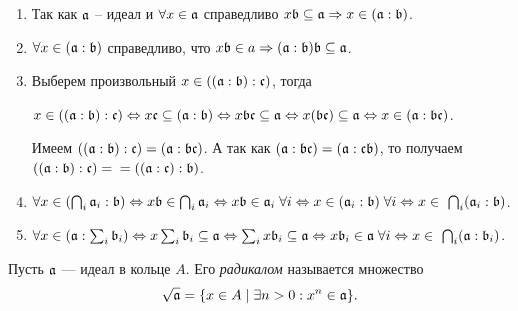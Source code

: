     \begin{Proof}
        \begin{enumerate}
            \item Так как $\mathfrak{a}$ -- идеал и $\forall x \in \mathfrak{a}$ справедливо $x\mathfrak{b} \subseteq \mathfrak{a} \Rightarrow x \in (\mathfrak{a} : \mathfrak{b})$.
            \item $\forall x \in (\mathfrak{a} : \mathfrak{b})$ справедливо, что $x\mathfrak{b} \in a \Rightarrow (\mathfrak{a} : \mathfrak{b})\mathfrak{b} \subseteq \mathfrak{a}$.
            \item Выберем произвольный $x \in ((\mathfrak{a} : \mathfrak{b}) : \mathfrak{c})$, тогда 
                  
                $x \in ((\mathfrak{a} : \mathfrak{b}) : \mathfrak{c})\Leftrightarrow x\mathfrak{c} \subseteq (\mathfrak{a} : \mathfrak{b}) \Leftrightarrow 
                x\mathfrak{bc} \subseteq \mathfrak{a} \Leftrightarrow x(\mathfrak{bc}) \subseteq \mathfrak{a} \Leftrightarrow x \in (\mathfrak{a} : \mathfrak{bc})$.

                Имеем $((\mathfrak{a} : \mathfrak{b}) : \mathfrak{c}) = (\mathfrak{a} : \mathfrak{bc})$.
                А так как $(\mathfrak{a} : \mathfrak{bc}) = (\mathfrak{a} : \mathfrak{cb})$, то получаем $((\mathfrak{a} : \mathfrak{b}) : \mathfrak{c}) = \\ =((\mathfrak{a} : \mathfrak{c}) : \mathfrak{b})$.
            \item $\forall x \in \left(\bigcap_i \mathfrak{a}_i : \mathfrak{b}\right) \Leftrightarrow x\mathfrak{b} \in \bigcap_i \mathfrak{a}_i \Leftrightarrow
                x\mathfrak{b} \in \mathfrak{a}_i\; \forall{i} \Leftrightarrow x \in (\mathfrak{a}_i : \mathfrak{b})\;\forall{i} \Leftrightarrow
                x\in~\bigcap_i (\mathfrak{a}_i : \mathfrak{b})$.
            \item $\forall x \in (\mathfrak{a} : \sum_i \mathfrak{b}_i) \Leftrightarrow x\sum_i{\mathfrak{b}_i} \subseteq \mathfrak{a} \Leftrightarrow
                \sum_i{x\mathfrak{b}_i} \subseteq \mathfrak{a} \Leftrightarrow x\mathfrak{b}_i \in \mathfrak{a}\;\forall{i} \Leftrightarrow
                x \in~\bigcap_i(\mathfrak{a} : \mathfrak{b}_i)$.
        \end{enumerate}
    \end{Proof}

    \begin{Def}
        Пусть $\mathfrak{a}$ --- идеал в кольце $A$. Его \textit{радикалом} называется множество 
        $$
            \sqrt{\mathfrak{a}} = \{x \in A \mid \exists n > 0 : x^n \in \mathfrak{a}\}.
        $$
    \end{Def}

